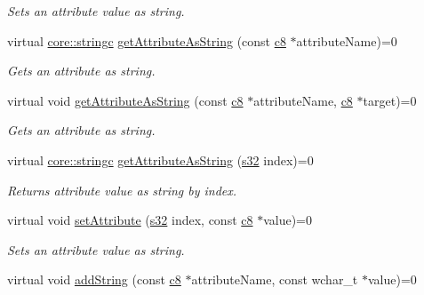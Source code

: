\begin{DoxyCompactItemize}
\begin{DoxyCompactList}\small\item\em Sets an attribute value as string. \end{DoxyCompactList}\item 
virtual \hyperlink{namespaceirr_1_1core_ade1071a878633f2f6d8a75c5d11fec19}{core\+::stringc} \hyperlink{classirr_1_1io_1_1IAttributes_a60f395fd008a70cc0531fa038c81f0ea}{get\+Attribute\+As\+String} (const \hyperlink{namespaceirr_a9395eaea339bcb546b319e9c96bf7410}{c8} $\ast$attribute\+Name)=0
\begin{DoxyCompactList}\small\item\em Gets an attribute as string. \end{DoxyCompactList}\item 
virtual void \hyperlink{classirr_1_1io_1_1IAttributes_a8d10d4874bcb90143ba11f6c548cff42}{get\+Attribute\+As\+String} (const \hyperlink{namespaceirr_a9395eaea339bcb546b319e9c96bf7410}{c8} $\ast$attribute\+Name, \hyperlink{namespaceirr_a9395eaea339bcb546b319e9c96bf7410}{c8} $\ast$target)=0
\begin{DoxyCompactList}\small\item\em Gets an attribute as string. \end{DoxyCompactList}\item 
virtual \hyperlink{namespaceirr_1_1core_ade1071a878633f2f6d8a75c5d11fec19}{core\+::stringc} \hyperlink{classirr_1_1io_1_1IAttributes_a9938e13ea4cc3e8e0ea3fadacaa97c5c}{get\+Attribute\+As\+String} (\hyperlink{namespaceirr_ac66849b7a6ed16e30ebede579f9b47c6}{s32} index)=0
\begin{DoxyCompactList}\small\item\em Returns attribute value as string by index. \end{DoxyCompactList}\item 
virtual void \hyperlink{classirr_1_1io_1_1IAttributes_a0d270e61c06e6553857f90946fe177f7}{set\+Attribute} (\hyperlink{namespaceirr_ac66849b7a6ed16e30ebede579f9b47c6}{s32} index, const \hyperlink{namespaceirr_a9395eaea339bcb546b319e9c96bf7410}{c8} $\ast$value)=0
\begin{DoxyCompactList}\small\item\em Sets an attribute value as string. \end{DoxyCompactList}\item 
\mbox{\label{classirr_1_1io_1_1IAttributes_a71cc4c6d4368b85a0567a50526eef9a3}} 
virtual void \hyperlink{classirr_1_1io_1_1IAttributes_a71cc4c6d4368b85a0567a50526eef9a3}{add\+String} (const \hyperlink{namespaceirr_a9395eaea339bcb546b319e9c96bf7410}{c8} $\ast$attribute\+Name, const wchar\+\_\+t $\ast$value)=0

\end{DoxyCompactItemize}
